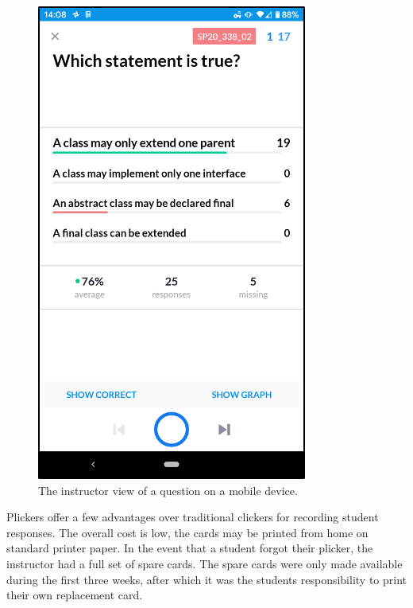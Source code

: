 \documentclass{article}
\begin{document}
\begin{figure}[ht]
  \centering
  \includegraphics[]{instructor_view.png}
  \caption{The instructor view of a question on a mobile device.}
  \label{fig:plicker_instructor_view}
\end{figure}

Plickers offer a few advantages over traditional clickers for recording student responses. The overall cost is low, the cards may be printed from home on standard printer paper. In the event that a student forgot their plicker, the instructor had a full set of spare cards. The spare cards were only made available during the first three weeks, after which it was the students responsibility to print their own replacement card. 
\end{document}
